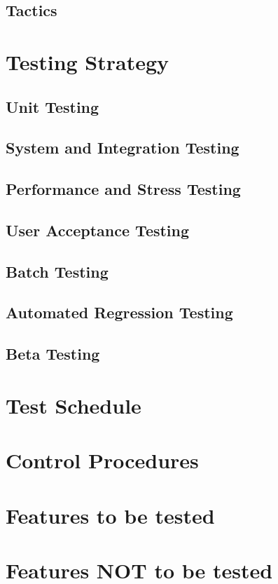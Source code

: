 \documentclass{article}
\begin{document}
    \subsection{Tactics}
\newpage

\section{Testing Strategy}
    \subsection{Unit Testing}
    \subsection{System and Integration Testing}
    \subsection{Performance and Stress Testing}
    \subsection{User Acceptance Testing}
    \subsection{Batch Testing}
    \subsection{Automated Regression Testing}
    \subsection{Beta Testing}
\newpage

\section{Test Schedule}
\newpage

\section{Control Procedures}
\newpage

\section{Features to be tested}
\newpage

\section{Features NOT to be tested}
\newpage
\end{document}
